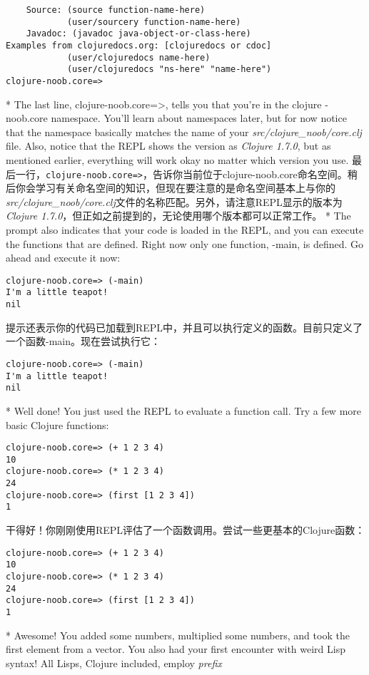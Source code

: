 \begin{paracol}{2}
\begin{verbatim}
    Source: (source function-name-here)
            (user/sourcery function-name-here)
    Javadoc: (javadoc java-object-or-class-here)
Examples from clojuredocs.org: [clojuredocs or cdoc]
            (user/clojuredocs name-here)
            (user/clojuredocs "ns-here" "name-here")
clojure-noob.core=>
\end{verbatim}
\switchcolumn[0]*
The last line, clojure-noob.core=\textgreater, tells you that you're in
the clojure -noob.core namespace. You'll learn about namespaces later,
but for now notice that the namespace basically matches the name of your
\emph{src/clojure\_noob/core.clj} file. Also, notice that the REPL shows
the version as \emph{Clojure 1.7.0}, but as mentioned earlier,
everything will work okay no matter which version you use.
\switchcolumn
最后一行，\verb|clojure-noob.core=>|，告诉你当前位于clojure-noob.core命名空间。稍后你会学习有关命名空间的知识，但现在要注意的是命名空间基本上与你的\emph{src/clojure\_noob/core.clj}文件的名称匹配。另外，请注意REPL显示的版本为\emph{Clojure 1.7.0}，但正如之前提到的，无论使用哪个版本都可以正常工作。
\switchcolumn[0]*
The prompt also indicates that your code is loaded in the REPL, and you
can execute the functions that are defined. Right now only one function,
-main, is defined. Go ahead and execute it now:
\begin{verbatim}
clojure-noob.core=> (-main)
I'm a little teapot!
nil
\end{verbatim}
\switchcolumn
提示还表示你的代码已加载到REPL中，并且可以执行定义的函数。目前只定义了一个函数-main。现在尝试执行它：
\begin{verbatim}
clojure-noob.core=> (-main)
I'm a little teapot!
nil
\end{verbatim}
\switchcolumn[0]*
Well done! You just used the REPL to evaluate a function call. Try a few
more basic Clojure functions:
\begin{verbatim}
clojure-noob.core=> (+ 1 2 3 4)
10
clojure-noob.core=> (* 1 2 3 4)
24
clojure-noob.core=> (first [1 2 3 4])
1
\end{verbatim}
\switchcolumn
干得好！你刚刚使用REPL评估了一个函数调用。尝试一些更基本的Clojure函数：
\begin{verbatim}
clojure-noob.core=> (+ 1 2 3 4)
10
clojure-noob.core=> (* 1 2 3 4)
24
clojure-noob.core=> (first [1 2 3 4])
1
\end{verbatim}
\switchcolumn[0]*
Awesome! You added some numbers, multiplied some numbers, and took the
first element from a vector. You also had your first encounter with
weird Lisp syntax! All Lisps, Clojure included, employ \emph{prefix
}
\end{paracol}
